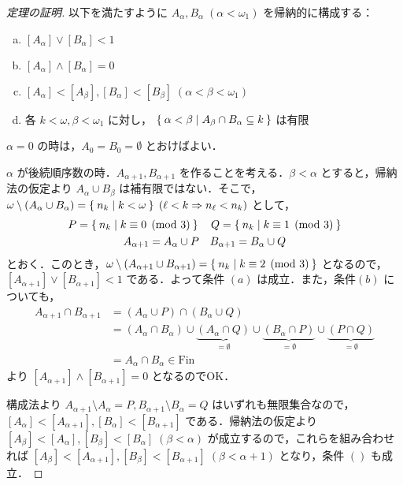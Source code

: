 \documentclass[a4j,uplatex]{jsarticle}
\newcommand{\Fin}{\mathrm{Fin}}
\begin{document}
\begin{proof}[定理の証明]
 以下を満たすように $A_\alpha, B_\alpha \; (\alpha < \omega_1)$ を帰納的に構成する：
 \begin{enumerate}[(a)]
  \item $[A_\alpha] \vee [B_\alpha] < 1$
	\label{cond:join-coinfinite}
  \item $[A_\alpha] \wedge [B_\alpha] = 0$
	\label{cond:almost-disj}
  \item $[A_\alpha] < [A_\beta], [B_\alpha] < [B_\beta]\;(\alpha < \beta < \omega_1)$
	\label{cond:increasing}
  \item 各 $k < \omega, \beta < \omega_1$ に対し，
	$\Set{\alpha < \beta | A_\beta \cap B_\alpha \subseteq k}$ は有限
	\label{cond:finiteness}
 \end{enumerate}

 $\alpha = 0$ の時は，$A_0 = B_0 = \emptyset$ とおけばよい．

 $\alpha$ が後続順序数の時．$A_{\alpha + 1}, B_{\alpha + 1}$ を作ることを考える．$\beta < \alpha$ とすると，帰納法の仮定より $A_\alpha \cup B_\beta$ は補有限ではない．そこで，$\omega \setminus (A_\alpha \cup B_\alpha) = \Set{ n_k | k < \omega } \; (\ell < k \Rightarrow n_\ell < n_k)$ として，
 \begin{gather*}
  P = \Set{n_k | k \equiv 0 \pmod{3}} \quad Q = \Set{n_k | k \equiv 1 \pmod{3}}\\
  A_{\alpha + 1} = A_\alpha \cup P \quad B_{\alpha + 1} = B_\alpha \cup Q
 \end{gather*}
  とおく．このとき，$\omega \setminus (A_{\alpha + 1} \cup B_{\alpha + 1}) = \Set{n_k | k \equiv 2 \pmod{3}}$ となるので，$[A_{\alpha + 1}] \vee [B_{\alpha+1}] < 1$ である．よって条件 $(a)$ は成立．また，条件$(b)$ についても，
 \begin{align*}
  A_{\alpha + 1} \cap B_{\alpha+1} &= (A_\alpha \cup P) \cap (B_\alpha \cup Q)\\
  &= (A_\alpha \cap B_\alpha) \cup \underbrace{ (A_\alpha \cap Q)}_{=\emptyset} \cup \underbrace{(B_\alpha \cap P)}_{=\emptyset} \cup \underbrace{(P \cap Q)}_{=\emptyset}\\
  &= A_\alpha \cap B_\alpha \in \Fin
 \end{align*}
 より $[A_{\alpha+1}] \wedge [B_{\alpha+1}] = 0$ となるのでOK．

 構成法より $A_{\alpha+1} \setminus A_{\alpha} = P,  B_{\alpha+1} \setminus B_\alpha = Q$ はいずれも無限集合なので，$[A_\alpha] < [A_{\alpha+1}], [B_\alpha] < [B_{\alpha+1}]$ である．帰納法の仮定より $[A_\beta] < [A_\alpha], [B_\beta] < [B_\alpha] \; (\beta < \alpha)$ が成立するので，これらを組み合わせれば $[A_\beta] < [A_{\alpha+1}], [B_\beta] < [B_{\alpha+1}] \; (\beta < \alpha+1)$ となり，条件 $()$ も成立．


\end{proof}
\end{document}
